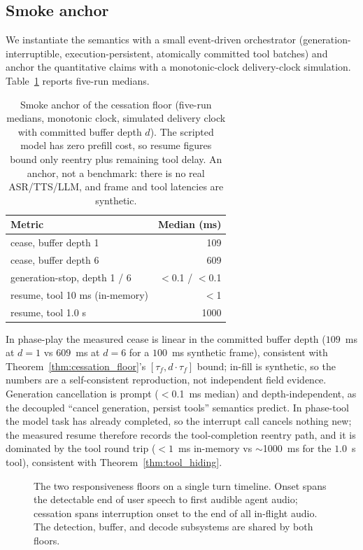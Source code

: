 \subsection{Smoke anchor}
We instantiate the semantics with a small event-driven orchestrator
(generation-interruptible, execution-persistent, atomically committed tool batches) and
anchor the quantitative claims with a monotonic-clock delivery-clock simulation.
Table~\ref{tab:smoke} reports five-run medians.

\begin{table}[t]
\centering
\begin{tabular}{lr}
\toprule
\textbf{Metric} & \textbf{Median (ms)} \\
\midrule
cease, buffer depth 1 & 109 \\
cease, buffer depth 6 & 609 \\
generation-stop, depth 1 / 6 & $<$0.1 / $<$0.1 \\
resume, tool 10 ms (in-memory) & $<$1 \\
resume, tool 1.0 s & 1000 \\
\bottomrule
\end{tabular}
\caption{Smoke anchor of the cessation floor (five-run medians, monotonic clock, simulated
delivery clock with committed buffer depth $d$). The scripted model has zero prefill cost, so
resume figures bound only reentry plus remaining tool delay. An anchor, not a benchmark:
there is no real ASR/TTS/LLM, and frame and tool latencies are synthetic.
\label{tab:smoke}}
\end{table}

In phase-play the measured cease is linear in the committed buffer depth
($109$~ms at $d=1$ vs $609$~ms at $d=6$ for a $100$~ms synthetic frame), consistent with
Theorem~\ref{thm:cessation_floor}'s $[\tau_f, d \cdot \tau_f]$ bound; in-fill is synthetic,
so the numbers are a self-consistent reproduction, not independent field evidence.
Generation cancellation is prompt ($<$0.1~ms median) and depth-independent, as the decoupled
``cancel generation, persist tools'' semantics predict.
In phase-tool the model task has already completed, so the interrupt call cancels nothing new;
the measured resume therefore records the tool-completion reentry path, and it is dominated by
the tool round trip ($< 1$~ms in-memory vs $\sim$1000~ms for the $1.0$~s tool), consistent
with Theorem~\ref{thm:tool_hiding}.

\begin{figure}[t]
\centering
%
\caption{The two responsiveness floors on a single turn timeline. Onset spans the detectable
end of user speech to first audible agent audio; cessation spans interruption onset to the end
of all in-flight audio. The detection, buffer, and decode subsystems are shared by both floors.
\label{fig:two_floors}}
\end{figure}

